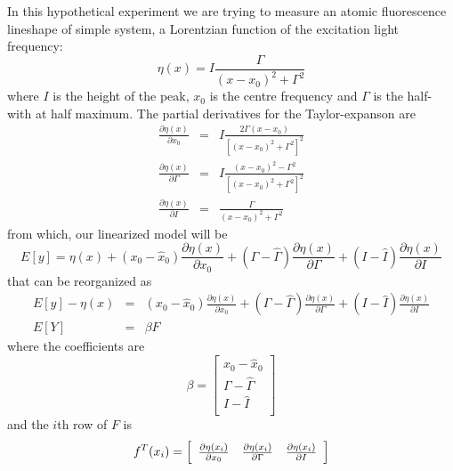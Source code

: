 \documentclass[12pt]{iopart}
\begin{document}
In this hypothetical experiment we are trying to measure an atomic fluorescence lineshape of simple system, a Lorentzian function of the excitation light frequency:
\begin{equation}
\eta(x) = I \frac{\Gamma}{(x - x_0)^2 + \Gamma^2}
\label{eq:lorentz3}
\end{equation}
where $I$ is the height of the peak, $x_0$ is the centre frequency and $\Gamma$ is the half-with at half maximum. The partial derivatives for the Taylor-expanson are
\begin{eqnarray}
\frac{\partial \eta(x)}{\partial x_0} &=& I \frac{2 \Gamma (x - x_0)}{\left[(x - x_0)^2 + \Gamma^2\right]^2} \\
\frac{\partial \eta(x)}{\partial \Gamma} &=& I \frac{(x - x_0)^2 - \Gamma^2}{\left[(x - x_0)^2 + \Gamma^2\right]^2} \\
\frac{\partial \eta(x)}{\partial I} &=& \frac{\Gamma}{(x - x_0)^2 + \Gamma^2}
\end{eqnarray}
from which, our linearized model will be
\begin{equation}
E[y] = \eta(x) + (x_0 - \hat x_0) \frac{\partial \eta(x)}{\partial x_0} + (\Gamma - \hat \Gamma) \frac{\partial \eta(x)}{\partial \Gamma} + (I - \hat I) \frac{\partial \eta(x)}{\partial I}
\end{equation}
that can be reorganized as
\begin{eqnarray}
E[y] - \eta(x) &=& (x_0 - \hat x_0) \frac{\partial \eta(x)}{\partial x_0} + (\Gamma - \hat \Gamma) \frac{\partial \eta(x)}{\partial \Gamma} + (I - \hat I) \frac{\partial \eta(x)}{\partial I}  \nonumber \\
E[Y] &=& \beta F
\end{eqnarray}
where the coefficients are
\begin{equation}
\beta = \left[
  \begin{array}{l}
    x_0 - \hat x_0 \\
    \Gamma - \hat \Gamma\\
    I - \hat I \\
  \end{array} \right ]
\end{equation}
 and the $i$th row of $F$ is
\begin{equation}
 f^T(x_i) = \left[
  \begin{array}{l l l}
   \frac{\partial \eta(x_i)}{\partial x_0} & \frac{\partial \eta(x_i)}{\partial \Gamma} & \frac{\partial \eta(x_i)}{\partial I}
  \end{array} \right ]
\end{equation}
\end{document}
